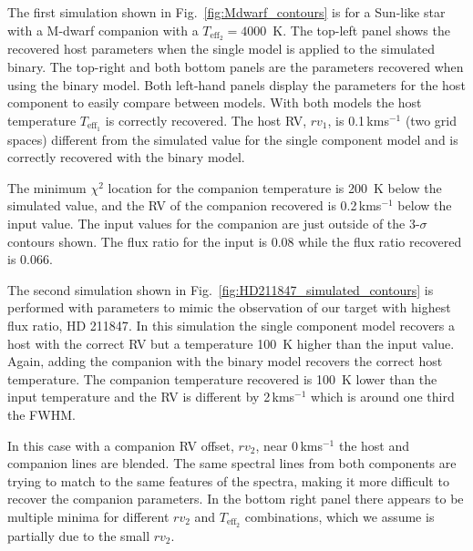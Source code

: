 \documentclass[fleqn,usenatbib]{mnras}
\newcommand{\kmps}{\,kms\(^{-1}\)}	%
\begin{document}
    The first simulation shown in Fig.~\ref{fig:Mdwarf_contours} is for a Sun-like star with a M-dwarf companion with a \(T_{\textrm{eff}_2} =4000\)~K. The top-left panel shows the recovered host parameters when the single model is applied to the simulated binary. The top-right and both bottom panels are the parameters recovered when using the binary model. Both left-hand panels display the parameters for the host component to easily compare between models. With both models the host temperature \(T_{\textrm{eff}_1}\) is correctly recovered. The host RV, \({rv}_1\), is 0.1\kmps{} (two grid spaces) different from the simulated value for the single component model and is correctly recovered with the binary model.
    
    The minimum \(\chi^2\) location for the companion temperature is 200~K below the simulated value, and the RV of the companion recovered is 0.2\kmps{} below the input value. The input values for the companion are just outside of the 3-\(\sigma\) contours shown. The flux ratio for the input is 0.08 while the flux ratio recovered is 0.066.
    
    The second simulation shown in Fig.~\ref{fig:HD211847_simulated_contours} is performed with parameters to mimic the observation of our target with highest flux ratio, {HD 211847}. In this simulation the single component model recovers a host with the correct RV but a temperature 100~K higher than the input value. Again, adding the companion with the binary model recovers the correct host temperature. The companion temperature recovered is 100~K lower than the input temperature and the RV is different by 2\kmps{} which is around one third the FWHM.
    
    In this case with a companion RV offset, \({rv}_2\), near 0\kmps{} the host and companion lines are blended. The same spectral lines from both components are trying to match to the same features of the spectra, making it more difficult to recover the companion parameters. In the bottom right panel there appears to be multiple minima for different \({rv}_2\) and \(T_{\textrm{eff}_2}\) combinations, which we assume is partially due to the small \({rv}_2\).
    
\end{document}
